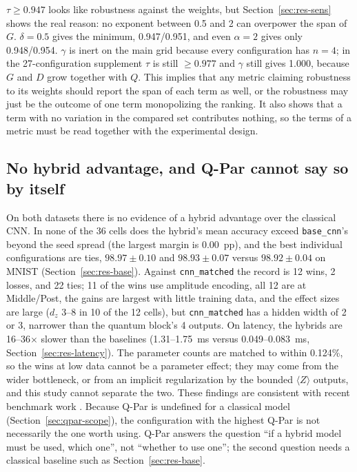 \documentclass{ieeeaccess}
\begin{document}
$\tau \geq 0.947$ looks like robustness against the weights, but Section~\ref{sec:res-sens} shows the real reason: no exponent between 0.5 and 2 can overpower the span of $G$. $\delta = 0.5$ gives the minimum, 0.947/0.951, and even $\alpha = 2$ gives only 0.948/0.954. $\gamma$ is inert on the main grid because every configuration has $n = 4$; in the 27-configuration supplement $\tau$ is still $\geq 0.977$ and $\gamma$ still gives 1.000, because $G$ and $D$ grow together with $Q$. This implies that any metric claiming robustness to its weights should report the span of each term as well, or the robustness may just be the outcome of one term monopolizing the ranking. It also shows that a term with no variation in the compared set contributes nothing, so the terms of a metric must be read together with the experimental design.

\subsection{No hybrid advantage, and Q-Par cannot say so by itself}
\label{sec:disc-classical}

On both datasets there is no evidence of a hybrid advantage over the classical CNN. In none of the 36 cells does the hybrid's mean accuracy exceed \texttt{base\_cnn}'s beyond the seed spread (the largest margin is 0.00~pp), and the best individual configurations are ties, $98.97 \pm 0.10$ and $98.93 \pm 0.07$ versus $98.92 \pm 0.04$ on MNIST (Section~\ref{sec:res-base}). Against \texttt{cnn\_matched} the record is 12 wins, 2 losses, and 22 ties; 11 of the wins use amplitude encoding, all 12 are at Middle/Post, the gains are largest with little training data, and the effect sizes are large ($d_z$ 3--8 in 10 of the 12 cells), but \texttt{cnn\_matched} has a hidden width of 2 or 3, narrower than the quantum block's 4 outputs. On latency, the hybrids are 16--36$\times$ slower than the baselines (1.31--1.75~ms versus 0.049--0.083~ms, Section~\ref{sec:res-latency}). The parameter counts are matched to within 0.124\%, so the wins at low data cannot be a parameter effect; they may come from the wider bottleneck, or from an implicit regularization by the bounded $\langle Z\rangle$ outputs, and this study cannot separate the two. These findings are consistent with recent benchmark work \cite{bowles2024better}. Because Q-Par is undefined for a classical model (Section~\ref{sec:qpar-scope}), the configuration with the highest Q-Par is not necessarily the one worth using. Q-Par answers the question ``if a hybrid model must be used, which one'', not ``whether to use one''; the second question needs a classical baseline such as Section~\ref{sec:res-base}.
\end{document}
